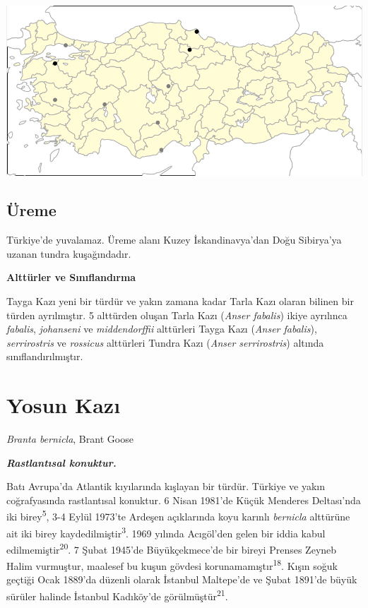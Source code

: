 \documentclass[
  letterpaper,
  DIV=11,
  numbers=noendperiod]{scrreprt}
\begin{document}
\includegraphics[width=6.25in,height=\textheight]{images/harita_Anser_serrirostris.png}

\hypertarget{uxfcreme-3}{%
\subsection{\texorpdfstring{\textbf{Üreme}}{Üreme}}\label{uxfcreme-3}}

Türkiye'de yuvalamaz. Üreme alanı Kuzey İskandinavya'dan Doğu Sibirya'ya
uzanan tundra kuşağındadır.

\textbf{Alttürler ve Sınıflandırma}

Tayga Kazı yeni bir türdür ve yakın zamana kadar Tarla Kazı olaran
bilinen bir türden ayrılmıştır. 5 alttürden oluşan Tarla Kazı
(\emph{Anser fabalis}) ikiye ayrılınca \emph{fabalis}, \emph{johanseni}
ve \emph{middendorffii} alttürleri Tayga Kazı (\emph{Anser fabalis}),
\emph{serrirostris} ve \emph{rossicus} alttürleri Tundra Kazı
(\emph{Anser serrirostris}) altında sınıflandırılmıştır.

\hypertarget{yosun-kazux131}{%
\section{Yosun Kazı}\label{yosun-kazux131}}

\emph{Branta bernicla}, Brant Goose

\textbf{\emph{Rastlantısal konuktur.}}

Batı Avrupa'da Atlantik kıyılarında kışlayan bir türdür. Türkiye ve
yakın coğrafyasında rastlantısal konuktur. 6 Nisan 1981'de Küçük
Menderes Deltası'nda iki birey\textsuperscript{5}, 3-4 Eylül 1973'te
Ardeşen açıklarında koyu karınlı \emph{bernicla} alttürüne ait iki birey
kaydedilmiştir\textsuperscript{3}. 1969 yılında Acıgöl'den gelen bir
iddia kabul edilmemiştir\textsuperscript{20}. 7 Şubat 1945'de
Büyükçekmece'de bir bireyi Prenses Zeyneb Halim vurmuştur, maalesef bu
kuşun gövdesi korunamamıştır\textsuperscript{18}. Kışın soğuk geçtiği
Ocak 1889'da düzenli olarak İstanbul Maltepe'de ve Şubat 1891'de büyük
sürüler halinde İstanbul Kadıköy'de görülmüştür\textsuperscript{21}.
\end{document}
